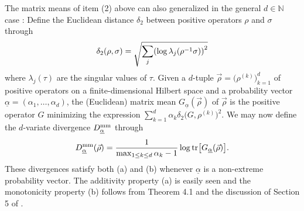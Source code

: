\documentclass[12pt,a4paper,reqno]{amsart}
\theoremstyle{definition}
\newcommand{\N}{\mathbb N}
\newcommand{\tr}[1]{\mathrm{tr}\left[#1\right]} %
\let\originalleft\left
\let\originalright\right
\renewcommand{\left}{\mathopen{}\mathclose\bgroup\originalleft}
\renewcommand{\right}{\aftergroup\egroup\originalright}
\begin{document}
The matrix means of item (2) above can also generalized in the general $d\in\N$ case \cite{Bhatia_Karandikar_2012}: Define the Euclidean distance $\delta_2$ between positive operators $\rho$ and $\sigma$ through
$$
\delta_2(\rho,\sigma)=\sqrt{\sum_j\left(\log{\lambda_j(\rho^{-1}\sigma)}\right)^2}
$$
where $\lambda_j(\tau)$ are the singular values of $\tau$. Given a $d$-tuple $\vec{\rho}=\big(\rho^{(k)}\big)_{k=1}^d$ of positive operators on a finite-dimensional Hilbert space and a probability vector $\underline{\alpha}=(\alpha_1,\ldots,\alpha_d)$, the (Euclidean) matrix mean $G_{\underline{\alpha}}(\vec{\rho})$ of $\vec{\rho}$ is the positive operator $G$ minimizing the expression $\sum_{k=1}^d\alpha_k\delta_2\big(G,\rho^{(k)}\big)^2$. We may now define the $d$-variate divergence $D^{\rm mm}_{\underline{\alpha}}$ through
\begin{equation}\label{eq:MatrixMeanDiv}
D^{\rm mm}_{\underline{\alpha}}(\vec{\rho})=\frac{1}{\max_{1\leq k\leq d}\alpha_k-1}\log{\tr{G_{\underline{\alpha}}(\vec{\rho})}}.
\end{equation}
These divergences satisfy both (a) and (b) whenever $\underline{\alpha}$ is a non-extreme probability vector. The additivity property (a) is easily seen and the monotonicity property (b) follows from Theorem 4.1 and the discussion of Section 5 of \cite{Bhatia_Karandikar_2012}.
\end{document}
